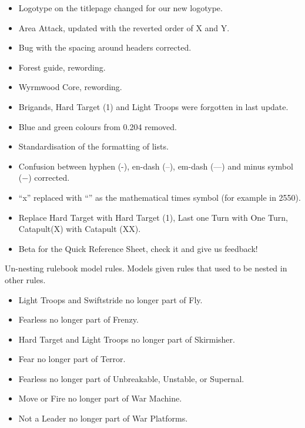 

\subtitle{0.205.2}

\begin{itemize}
\item Logotype on the titlepage changed for our new logotype.
\item Area Attack, updated with the reverted order of X and Y.
\item Bug with the spacing around headers corrected.
\end{itemize}

\subtitle{0.205.1}

\begin{itemize}
\item Forest guide, rewording.
\item Wyrmwood Core, rewording.
\item Brigands, Hard Target (1) and Light Troops were forgotten in last update.
\end{itemize}

\subtitle{0.205.0}

\begin{itemize}
\item Blue and green colours from 0.204 removed.
\item Standardisation of the formatting of lists.
\item Confusion between hyphen (-), en-dash (--), em-dash (---) and minus symbol (−) corrected.
\item \enquote{x} replaced with \enquote{\timess{}} as the mathematical times symbol (for example in 25\timess{}50).
\item Replace Hard Target with Hard Target (1), Last one Turn with One Turn, Catapult(X) with Catapult (X\timess{}X).
\item Beta for the Quick Reference Sheet, check it and give us feedback!
\end{itemize}

Un-nesting rulebook model rules. Models given rules that used to be nested in other rules.
\begin{itemize}[label={-}]
\item Light Troops and Swiftstride no longer part of Fly.
\item Fearless no longer part of Frenzy.
\item Hard Target and Light Troops no longer part of Skirmisher.
\item Fear no longer part of Terror.
\item Fearless no longer part of Unbreakable, Unstable, or Supernal.
\item Move or Fire no longer part of War Machine.
\item Not a Leader no longer part of War Platforms.
\end{itemize}


